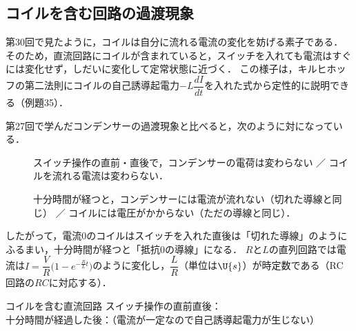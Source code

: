 \setcounter{nombre}{34}

\subsection{コイルを含む回路の過渡現象}

第30回で見たように，コイルは{\gtfamily 自分に流れる電流の変化を妨げる}素子である．
そのため，直流回路にコイルが含まれていると，スイッチを入れても電流はすぐには変化せず，しだいに変化して定常状態に近づく．
この様子は，キルヒホッフの第二法則にコイルの自己誘導起電力$-L\dfrac{dI}{dt}$を入れた式から定性的に説明できる（例題35）．

第27回で学んだコンデンサーの過渡現象と比べると，次のように対になっている．
\begin{description}
\item[] スイッチ操作の直前・直後で，{\gtfamily コンデンサーの電荷}は変わらない ／ {\gtfamily コイルを流れる電流}は変わらない．
\item[] 十分時間が経つと，コンデンサーには電流が流れない（切れた導線と同じ） ／ コイルには電圧がかからない（ただの導線と同じ）．
\end{description}
したがって，電流$0$のコイルはスイッチを入れた直後は「切れた導線」のようにふるまい，十分時間が経つと「抵抗$0$の導線」になる．
$R$と$L$の直列回路では電流は$I=\dfrac{V}{R}\bigl(1-e^{-\frac{R}{L}t}\bigr)$のように変化し，$\dfrac{L}{R}$（単位は$\U{s}$）が{\gtfamily 時定数}である（RC 回路の$RC$に対応する）．

\bsNeed{30mm}
\begin{matome}{コイルを含む直流回路}
 \hspace{3mm} スイッチ操作の直前直後：\\
 \hspace{3mm} 十分時間が経過した後：（電流が一定なので自己誘導起電力が生じない）
\end{matome}

